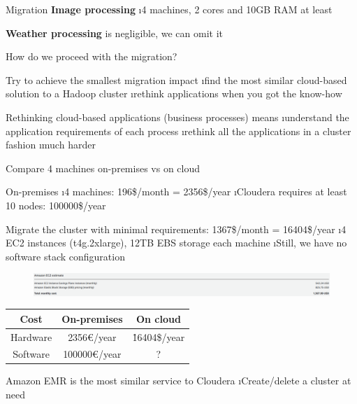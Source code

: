 \begin{frame}{Migration}
\textbf{Image processing}
\i 4 machines, 2 cores and 10GB RAM at least

\textbf{Weather processing} is negligible, we can omit it

\framebreak

How do we proceed with the migration?

Try to achieve the smallest migration impact
\i find the most similar cloud-based solution to a Hadoop cluster
\i rethink applications when you got the know-how

Rethinking cloud-based applications (business processes) means
\i understand the application requirements of each process
\i rethink all the applications in a cluster fashion
\i much harder

\framebreak

Compare 4 machines on-premises vs on cloud

On-premises
\i 4 machines: 196\$/month = 2356\$/year
\i Cloudera requires at least 10 nodes: 100000\$/year

Migrate the cluster with minimal requirements: 1367\$/month = 16404\$/year
\i 4 EC2 instances (t4g.2xlarge), 12TB EBS storage each machine
\i Still, we have no software stack configuration

\framebreak

\begin{figure}
    \centering
    \includegraphics[scale=.5]{imgs/migration_aws_asonprem2.PNG}
\end{figure}

\begin{table}[h!]
    \centering
    \footnotesize
    \begin{tabular}{ccc}
        Cost     &  On-premises       & On cloud          \\\hline
        Hardware &  2356\euro{}/year  & \r{16404\$/year} \\
        Software & 100000\euro{}/year & ?                 \\
    \end{tabular}
\end{table}

\framebreak

Amazon EMR is the most similar service to Cloudera
\i Create/delete a cluster at need


\end{frame}
